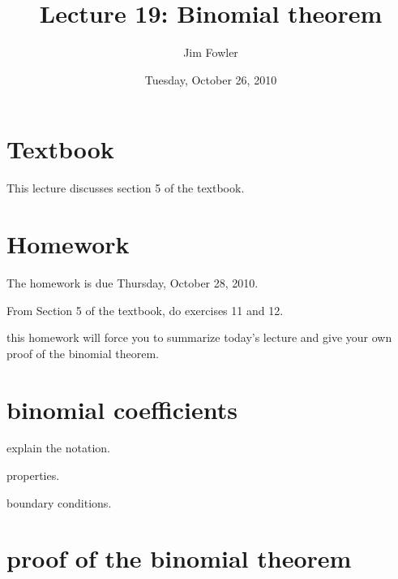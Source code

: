 \documentclass[12pt]{handout}
\title{Lecture 19: Binomial theorem}
\author{Jim Fowler}
\date{Tuesday, October 26, 2010}
\begin{document}
\maketitle

\section*{Textbook}

This lecture discusses section 5 of the textbook.

\section*{Homework} 

The homework is due Thursday, October 28, 2010.

From Section 5 of the textbook, do exercises 11 and 12.

this homework will force you to summarize today's lecture and give
your own proof of the binomial theorem.

\section*{binomial coefficients}

explain the notation.

properties.

boundary conditions.

\section*{proof of the binomial theorem}
\end{document}

